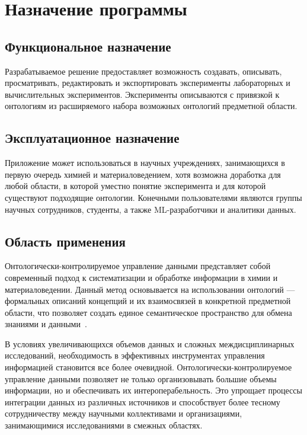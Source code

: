 \documentclass[a4paper,12pt,reqno]{article}
\begin{document}



\firstPage
\newpage
\secondPage
\newpage
\thirdPage
\newpage

\section{Назначение программы}
\subsection{Функциональное назначение}
Разрабатываемое решение предоставляет возможность создавать, описывать, просматривать, редактировать и экспортировать эксперименты лабораторных и вычислительных экспериментов. Эксперименты описываются с привязкой к онтологиям из расширяемого набора возможных онтологий предметной области.

\subsection{Эксплуатационное назначение}
Приложение может использоваться в научных учреждениях, занимающихся в первую очередь химией и материаловедением, хотя возможна доработка для любой области, в которой уместно понятие эксперимента и для которой существуют подходящие онтологии. Конечными пользователями являются группы научных сотрудников, студенты, а также ML-разработчики и аналитики данных.

\subsection{Область применения}
Онтологически-контролируемое управление данными представляет собой современный подход к систематизации и обработке информации в химии и материаловедении. Данный метод основывается на использовании онтологий — формальных описаний концепций и их взаимосвязей в конкретной предметной области, что позволяет создать единое семантическое пространство для обмена знаниями и данными~\cite{ontology:base}.

В условиях увеличивающихся объемов данных и сложных междисциплинарных исследований, необходимость в эффективных инструментах управления информацией становится все более очевидной. Онтологически-контролируемое управление данными позволяет не только организовывать большие объемы информации, но и обеспечивать их интероперабельность. Это упрощает процессы интеграции данных из различных источников и способствует более тесному сотрудничеству между научными коллективами и организациями, занимающимися исследованиями в смежных областях.
\end{document}
